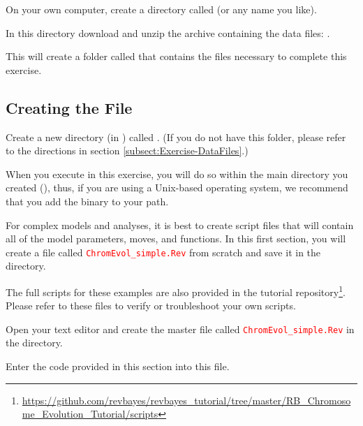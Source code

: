 {\begin{framed}
On your own computer, create a directory called {\textcolor{red}{}} (or any name you like). 

In this directory download and unzip the archive containing the data files: \href{https://github.com/revbayes/revbayes_tutorial/tree/master/RB_Chromosome_Evolution_Tutorial/data.zip}{}.

This will create a folder called  that contains the files necessary to complete this exercise.

\end{framed}}


\bigskip
\subsection{Creating the \Rev File}\label{subsect:Exercise-CreatingFiles}

{\begin{framed}
Create a new directory (in ) called {\textcolor{red}{}}. (If you do not have this folder, please refer to the directions in section \ref{subsect:Exercise-DataFiles}.)
\end{framed}}

When you execute \RevBayes in this exercise, you will do so within the main directory you created (), thus, if you are using a Unix-based operating system, we recommend that you add the \RevBayes binary to your path.
\bigskip

For complex models and analyses, it is best to create \Rev script files that will contain all of the model parameters, moves, and functions. 
In this first section, you will create a file called \textcolor{red}{\texttt{ChromEvol\_simple.Rev}} from scratch and save it in the  directory.

The full scripts for these examples are also provided in the \RevBayes tutorial repository\footnote{\url{https://github.com/revbayes/revbayes_tutorial/tree/master/RB_Chromosome_Evolution_Tutorial/scripts}}. 
Please refer to these files to verify or troubleshoot your own scripts. 

{\begin{framed}
Open your text editor and create the master \Rev file called {\textcolor{red}{\texttt{ChromEvol\_simple.Rev}}} in the  directory.

Enter the \Rev code provided in this section into this file.
\end{framed}}

